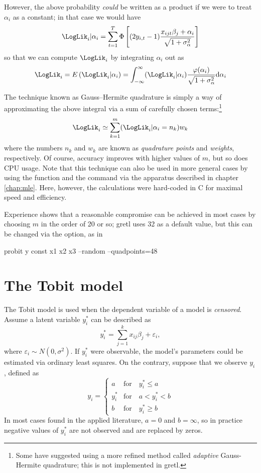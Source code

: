 However, the above probability \emph{could} be written as a product if
we were to treat $\alpha_i$ as a constant; in that case we would have
\[
\LogLik_i | \alpha_i = \sum_{t=1}^T 
\Phi\left[ 
(2 y_{i,t} - 1) \frac{x_{ijt} \beta_j + \alpha_i}{\sqrt{1 + \sigma^2_{\alpha}}}
\right]
\]
so that we can compute $\LogLik_i$ by integrating $\alpha_i$ out as
\[
\LogLik_i = E\left( \LogLik_i | \alpha_i \right) =
\int_{-\infty}^{\infty} (\LogLik_i | \alpha_i)
\frac{\varphi(\alpha_i)}{\sqrt{1 + \sigma^2_{\alpha}}} \mathrm{d} \alpha_i 
\]

The technique known as Gauss--Hermite quadrature is simply a way of
approximating the above integral via a sum of carefully chosen
terms:\footnote{Some have suggested using a more refined method called
  \emph{adaptive} Gauss-Hermite quadrature; this is not implemented in
  gretl.}
\[
\LogLik_i \simeq \sum_{k=1}^{m} (\LogLik_i | \alpha_i = n_k ) w_k
\]
where the numbers $n_k$ and $w_k$ are known as \emph{quadrature
  points} and \emph{weights}, respectively. Of course, accuracy
improves with higher values of $m$, but so does CPU usage. Note that
this technique can also be used in more general cases by using the
 function and the  command via the apparatus
described in chapter \ref{chap:mle}. Here, however, the calculations
were hard-coded in C for maximal speed and efficiency.

Experience shows that a reasonable compromise can be achieved in most
cases by choosing $m$ in the order of 20 or so; gretl uses 32 as
a default value, but this can be changed via the 
option, as in
\begin{code}
  probit y const x1 x2 x3 --random --quadpoints=48
\end{code}

 
\section{The Tobit model}
\label{sec:tobit}

The Tobit model is used when the dependent variable of a model is
\emph{censored}. Assume a latent variable $y^*_i$ can be described
as
\[
  y^*_i = \sum_{j=1}^k x_{ij} \beta_j + \varepsilon_i ,
\]
where $\varepsilon_i \sim N(0,\sigma^2)$. If $y^*_i$ were observable,
the model's parameters could be estimated via ordinary least squares.
On the contrary, suppose that we observe $y_i$, defined as
%
\begin{equation}
  \label{eq:tobit}
  y_i = \left\{ 
    \begin{array}{ll}
      a & \mathrm{for} \quad y^*_i \le a \\
      y^*_i & \mathrm{for} \quad a < y^*_i < b \\ 
      b & \mathrm{for} \quad y^*_i \ge b 
    \end{array}
    \right. 
\end{equation}
In most cases found in the applied literature, $a=0$ and $b=\infty$,
so in practice negative values of $y^*_i$ are not observed and are
replaced by zeros.

